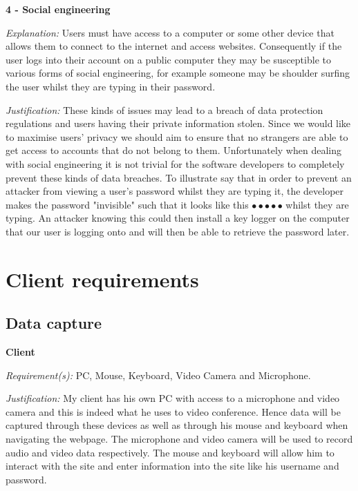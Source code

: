 \textsf{\bfseries 4 - Social engineering} \\ \vspace{0.1cm}

\textit{Explanation:}
Users must have access to a computer or some other device that
allows them to connect to the internet and access websites. 
Consequently if the user logs into their account on a public 
computer they may be susceptible to various forms of social 
engineering, for example someone may be shoulder surfing the 
user whilst they are typing in their password. \vspace{0.1cm}

\textit{Justification:}
These kinds of issues may lead to a breach of data protection
regulations and users having their private information stolen.
Since we would like to maximise users' privacy we should aim 
to ensure that no strangers are able to get access to accounts
that do not belong to them. Unfortunately when dealing with 
social engineering it is not trivial for the software 
developers to completely prevent these kinds of data breaches.
To illustrate say that in order to prevent an attacker from 
viewing a user's password whilst they are typing it, the 
developer makes the password "invisible" such that it looks
like this  $\bullet \bullet \bullet \bullet \bullet$ whilst
they are typing. An attacker knowing this could then install 
a key logger on the computer that our user is logging onto and
will then be able to retrieve the password later.

\section{Client requirements}

\subsection{Data capture}

\textsf{\bfseries Client} \\ \vspace{0.1cm}

\textit{Requirement(s):} PC, Mouse, Keyboard, Video Camera and Microphone.
\\ \vspace{0.1cm}

\textit{Justification:}
My client has his own PC with access to a microphone 
and video camera and this is indeed what he uses to 
video conference. Hence data will be captured 
through these devices as well as through his mouse 
and keyboard when navigating the webpage. The microphone
and video camera will be used to record audio and video 
data respectively. The mouse and keyboard will allow 
him to interact with the site and enter information 
into the site like his username and password.
\\ \vspace{0.2cm}


